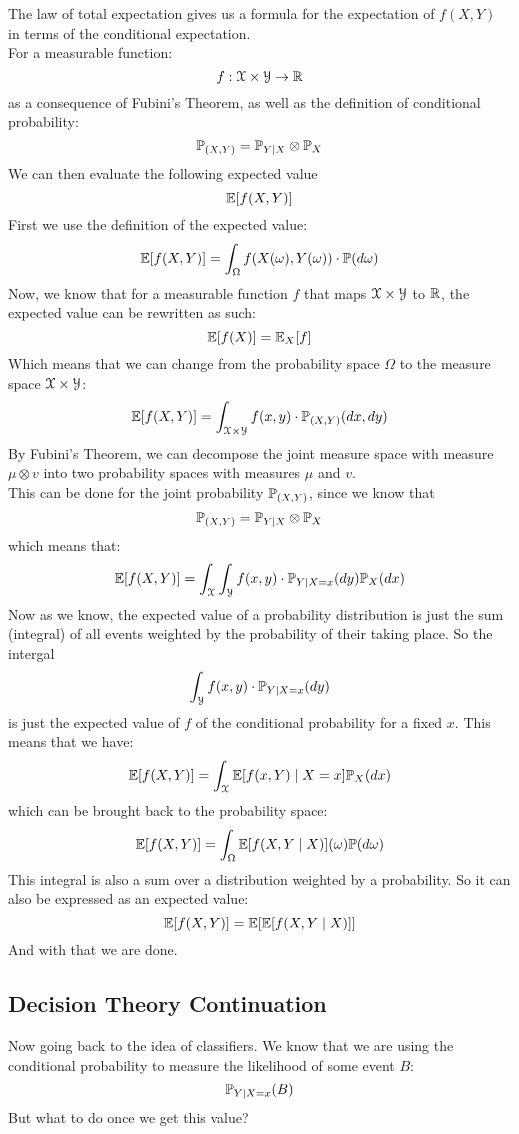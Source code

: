 \documentclass[12pt]{article}
\begin{document}
The law of total expectation
gives us a formula for the expectation
of $f(X, Y)$ in terms of the conditional
expectation. \\

For a measurable function:
\[ f: \mathcal{X} \times \mathcal{Y} \to \mathbb{R} \]
as a consequence of Fubini's Theorem,
as well as the definition of
conditional probability:
\[ \mathbb{P}_{(X, Y)} = \mathbb{P}_{Y|X}
\otimes \mathbb{P}_X \]
We can then evaluate the following
expected value
\[ \mathbb{E}[f(X, Y)] \]
First we use the definition
of the expected value:
\[ \mathbb{E}[f(X, Y)]
= \int_{\Omega}f(X(\omega), Y(\omega))
\cdot \mathbb{P}(d\omega) \]
Now, we know that
for a measurable function $f$
that maps $\mathcal{X} \times \mathcal{Y}$
to $\mathbb{R}$,
the expected value can be rewritten
as such:
\[ \mathbb{E}[f(X)] = \mathbb{E}_X[f] \]
Which means that we can change from
the probability space $\Omega$ to the
measure space $\mathcal{X} \times \mathcal{Y}$:
\[ \mathbb{E}[f(X, Y)]
= \int_{\mathcal{X} \times \mathcal{Y}} f(x, y)
\cdot \mathbb{P}_{(X, Y)}(dx, dy) \]
By Fubini's Theorem,
we can decompose the joint
measure space with measure $\mu \otimes v$
into two probability spaces
with measures $\mu$ and $v$. \\
This can be done for the joint
probability $\mathbb{P}_{(X, Y)}$,
since we know that 
\[ \mathbb{P}_{(X, Y)} = \mathbb{P}_{Y|X}
\otimes \mathbb{P}_X \]
which means that:
\[ \mathbb{E}[f(X, Y)]
= \int_{\mathcal{X}} \int_{\mathcal{Y}} f(x, y)
\cdot \mathbb{P}_{Y \mid X = x}(dy)
\mathbb{P}_X(dx) \]
Now as we know, the expected
value of a probability distribution
is just the sum (integral)
of all events weighted by the
probability of their taking place.
So the intergal
\[ \int_{\mathcal{Y}} f(x, y)
\cdot \mathbb{P}_{Y \mid X = x}(dy) \]
is just the expected value of $f$
of the
conditional probability for a fixed $x$.
This means that we have:
\[ \mathbb{E}[f(X, Y)]
= \int_{\mathcal{X}} \mathbb{E}[f(x, Y)
\mid X = x]
\mathbb{P}_X(dx) \]
which can be brought back to the
probability space:
\[ \mathbb{E}[f(X, Y)]
= \int_{\Omega} \mathbb{E}[f(X, Y \mid X)](\omega)
\mathbb{P}(d\omega) \]
This integral is also a sum
over a distribution weighted
by a probability.
So it can also be expressed as
an expected value:
\[ \mathbb{E}[f(X, Y)]
= \mathbb{E}[\mathbb{E}[f(X, Y \mid X)]] \]
And with that we are done. \\

\newpage

\subsection*{Decision Theory Continuation}

Now going back to the idea of classifiers.
We know that we are using the conditional
probability
to measure the likelihood of some event
$B$:
\[ \mathbb{P}_{Y \mid X = x}(B) \]
But what to do once we get this value? \\
\end{document}
